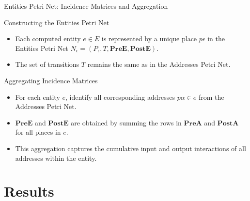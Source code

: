 \documentclass{beamer}
\begin{document}
\begin{frame}{Entities Petri Net: Incidence Matrices and Aggregation}
    \footnotesize
    \begin{block}{Constructing the Entities Petri Net}
        \begin{itemize}
            \item Each computed entity \(e \in E\) is represented by a unique place \(p\epsilon\) in the Entities Petri Net \(N_{\epsilon}=(P_{\epsilon}, T, \mathbf{PreE}, \mathbf{PostE})\).
            \item The set of transitions \(T\) remains the same as in the Addresses Petri Net.
        \end{itemize}
    \end{block}

    \begin{block}{Aggregating Incidence Matrices}
        \begin{itemize}
            \item For each entity \(e\), identify all corresponding addresses \(p\alpha \in e\) from the Addresses Petri Net.
            \item \(\mathbf{PreE}\) and \(\mathbf{PostE}\) are obtained by summing the rows in \(\mathbf{PreA}\) and \(\mathbf{PostA}\) for all places in \(e\).
            \item This aggregation captures the cumulative input and output interactions of all addresses within the entity.
        \end{itemize}
    \end{block}

\end{frame}

\section{Results}
\end{document}
